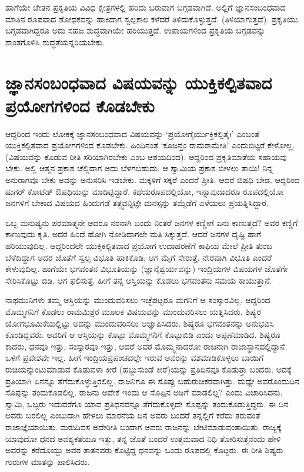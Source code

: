 ಹಾಗೆಯೇ ಚೇತನ ಪ್ರಕೃತಿಯ ವಿವಿಧ ಕ್ಷೇತ್ರಗಳಲ್ಲಿ ಹರಿದು ಬರುವಾಗ ಬಗ್ಗಡವಾಗಿದೆ. ಅಲ್ಲಿಗೆ ಜ್ಞಾನಸಂಬಂಧವಾದ ಮಾತಿನ ರೂಪವಾದ ಶೋಧಕವನ್ನು ಹಾಕಿದಾಗ ಸ್ವಲ್ಪಕಾಲ ಕಳೆದರೆ ತಿಳಿದುಕೊಳ್ಳುತ್ತದೆ. (ತಿಳಿಯಾಗುತ್ತದೆ). ಪ್ರಕೃತಿಯು ಬಗ್ಗಡವಾಗಿದ್ದರೂ ಅದು ಸಹಜ ಶುದ್ಧವಾಗಿಯೇ ಹರಿಯುತ್ತದೆ. ಉಪಾಯಗಳಿಂದ ಪ್ರಕೃತಿಯ ಬಗ್ಗಡವನ್ನು ಶಾಂತಗೊಳಿಸಿ ಶುದ್ಧತೆಯನ್ನರಿಯಬೇಕು.

\section*{ಜ್ಞಾನಸಂಬಂಧವಾದ ವಿಷಯವನ್ನು ಯುಕ್ತಿಕಲ್ಪಿತವಾದ ಪ್ರಯೋಗಗಳಿಂದ ಕೊಡಬೇಕು}

ಆದ್ದರಿಂದ ಇಂದು ಲೋಕಕ್ಕೆ ಜ್ಞಾನಸಂಬಂಧವಾದ ವಿಷಯವನ್ನು `ಪ್ರಯೋಗೈರ್ಯುಕ್ತಿಕಲ್ಪಿತೈಃ' ಎಂಬಂತೆ ಯುಕ್ತಿಕಲ್ಪಿತವಾದ ಪ್ರಯೋಗಗಳಿಂದ ಕೊಡಬೇಕು. ಹಿಂದಿನಂತೆ `ಕೂಜನ್ತಂ ರಾಮರಾಮೇತಿ' ಎಂದುಬಿಟ್ಟರೆ ಕೇಳೋಲ್ಲ. (ವಿಷಯವನ್ನು ಕೊಡುವ ರೀತಿ ಸರಿಯಾಗಿರಬೇಕು ಎಂಬ ಆಶಯದಿಂದ). ಆದ್ದರಿಂದ ಪ್ರಕೃತಿಮಾತೆಯ ಸಹಾಯವು ಬೇಕು. ಅಲ್ಲಿ ಆತ್ಮನ ಪ್ರಕಾಶ ಚೆಲ್ಲಿದಾಗ ಅದು ಬೆಳಗಬಹುದು. ಆ ಸ್ವಾಮಿಯ ಪ್ರಕಾಶ ಬೀಳಲು ತಾಯಿ! ನಿನ್ನ ಅನುರಾಗವೂ ಬೇಕು ಅದನ್ನು ಅನುಸರಿಸಿ ಇಡಬೇಕು. ಮಕ್ಕಳಿಗೆ ಸಕ್ಕರೆ ಎಂದರೆ ಪ್ರೀತಿ. ಆದರೆ ಔಷಧಿ ಬೇಡ. ಆದ್ದರಿಂದ ಷುಗರ್ ಕೋಟೆಡ್ ಔಷಧಿಯನ್ನು ಮಾಡಿಟ್ಟಿದ್ದಾರೆ. ಕಥೆಯರೂಪದಲ್ಲಿಯೋ, ಇನ್ನಾವುದಾದರೂ ರೂಪದಲ್ಲಿಯೋ ಜನಗಳಿಗೆ ಬೇಕಾದ ವಿಷಯದ ಹಿಂದುಗಡೆ ತತ್ತ್ವವನ್ನಿಟ್ಟೇ ಮನಸ್ಸನ್ನು ತಮ್ಮೆಡೆಗೆ ಎಳೆಯಲು ಪ್ರಯತ್ನಿಸಿದ್ದಾರೆ.

ಒಬ್ಬ ಮನುಷ್ಯನು ಪರಮಾತ್ಮನೇ ಆದರೂ ನರನಾಗಿ ಬಂದು ನಿಂತರೆ ಜನಗಳ ಕಣ್ಣೀಗೆ ಏನು ಕಾಣುತ್ತದೆ? ಅವರ ಕಣ್ಣಿಗೆ ಕಾಣುವುದು ಕೃತಿ. ಅದರ ಹಿಂದೆ ಹೋಗಿ ನೋಡಿದಾಗಲೇ ಮತಿ ಸಿಕ್ಕುತ್ತದೆ. ಆದರೆ ಜನಗಳ ದೃಷ್ಟಿ ಹಾಗೆ ಹರಿಯುವುದಿಲ್ಲ. ಆದ್ದರಿಂದಲೇ ಯುಕ್ತಿಕಲ್ಪಿತವಾದ ಪ್ರಯೋಗ ಉದಾಹರಣೆಗೆ ಕಾಫಿಯ ಮೇಲೆ ಪ್ರೀತಿ ತುಂಬ ಬೆಳೆದಿದ್ದಾಗ ಅದರ ಜೊತೆಗೆ ಸ್ವಲ್ಪ ವಿಭೂತಿ ಹಾಕಿಕೊಡಿ, ಆಗ ಮೈಗೆ ಸೇರುತ್ತೆ. ನೇರವಾಗಿ ವಿಭೂತಿ ಎಂದರೆ ಕೇಳುವುದಿಲ್ಲ. ಹಾಗೆಯೇ ಭಗವಂತನ ವಿಭೂತಿಯನ್ನು (ಜ್ಞಾನೈಶ್ವರ್ಯವನ್ನು) ಇಂದ್ರಿಯಗಳ ವಿಷಯಗಳ ಜೊತೆಗೇ ಸೇರಿಸಿಕೊಟ್ಟು ಬಿಡಿ. ಆಗ ಫಲಿಸುತ್ತೆ. ಹೀಗೆ ತನ್ನ ಆಸ್ತಿಯನ್ನು ಕೊಡಲು ಭಗವಂತನು ಸಮಯ ಕಾಯುತ್ತಾನೆ.

ನಾಥಮುನಿಗಳು ತಮ್ಮ ಆಸ್ತಿಯನ್ನು ಮುಂದುವರಿಸಲು ಇಚ್ಛೆಪಟ್ಟರೂ ಮಗನಿಗೆ ಆ ಸಂಸ್ಕಾರವಿಲ್ಲ. ಆದ್ದರಿಂದ ಮೊಮ್ಮಗನಿಗೆ ಕೊಡಲು ರಾಮಮಿಶ್ರರ ಮೂಲಕ ವಿಷಯವನ್ನು ಮುಂದುವರಿಸಲು ಯತ್ನಿಸಿದರು. ಶಿಷ್ಯರ ಯೋಗಭೂಮಿಕೆಯಲ್ಲಿಟ್ಟು ಅದನ್ನು ಮುಂದುವರಿಸಲು ಆಜ್ಞಾಪಿಸಿದರು. ಶಿಷ್ಯರೂ ಭಗವಂತನನ್ನು ಅನುಭವಿಸಿ ಕೊಂಡಿದ್ದವರು. ಅವರಿಗೆ ಆ ಆಸ್ತಿಯನ್ನು ಕೊಟ್ಟು ಮೊಮ್ಮಗನಿಗೆ ಕೊಟ್ಟುಬಿಡಿ ಎಂದು ಅಪ್ಪಣೆಮಾಡಿದ. ಶಿಷ್ಯರೂ ಕಾದರು, ಧನವೂ ಇತ್ತು, ಸಂಸ್ಕಾರವೂ ಇತ್ತು, ಆದರೆ ಅವರ ಮೊಮ್ಮ್ಗನಾದರೋ ರಾಜನಾಗಿ ರಾಜಾಸ್ಥಾನದಲ್ಲಿದ್ದಾನೆ. ಒಳಗೆ ಪ್ರವೇಶವೇ ಇಲ್ಲ. ಹೀಗೆ ಇಂದ್ರಿಯಪ್ರಪಂಚದಲ್ಲೇ ಇರುವ ಅವರನ್ನು ವಶಮಾಡಿಕೊಳ್ಳಲು ಬಾಯಿಗೆ ರುಚಿಯನ್ನುಂಟುಮಾಡುವ ಕೊಡುವಳಾ ಕೀರೆ (ಹಬ್ಬುಸುಂಡೆ ಕೀರೆ)ಯನ್ನು ಪ್ರತಿದಿನವೂ ಕೊಡುತ್ತಾ ಬಂದರು. ಅದಕ್ಕೆ ಪ್ರತಿಯಾಗಿ ಏನನ್ನೂ ತೆಗೆದುಕೊಳ್ಳುತ್ತಿರಲಿಲ್ಲ. ರಾಜನಿಗೂ ಈ ಸೊಪ್ಪು ಬಹುರುಚಿಕರವಾಗಿತ್ತು. ಮಧ್ಯೇ ಅವರೊಂದುದಿನ ಸೊಪ್ಪನ್ನು ತಂದುಕೊಡಲಿಲ್ಲ. ರಾಜನು ಅದೇಕೆ ಇಂದು ಆ ಸೊಪ್ಪಿನ ಅಡಿಗೆ ಮಾಡಲಿಲ್ಲ? ಎಂದು ವಿಚಾರಿಸಿದನು. ಸ್ವಾಮಿ, ಒಬ್ಬರು ಇದುವರೆಗೂ ಯಾವ ಪ್ರತಿಧನವನ್ನೂ ತೆಗೆದುಕೊಳ್ಳದೇ ಸೊಪ್ಪನ್ನು ತಂದುಕೊಡುತ್ತಿದ್ದರು. ಈ ದಿನ ಅವರು ಬರಲಿಲ್ಲ ಎಂಬುದಾಗಿ ಹೇಳಲು ಮಾರನೆಯ ದಿನ ಅವರು ಬಂದರೆ ತನ್ನಲ್ಲಿಗೆ ಕರೆದು ತರುವಂತೆ ರಾಜಾಜ್ಞೆಯಾಯಿತು. ಮರುದಿವಸ ಅದೇರೀತಿ ಬಂದಾಗ ಅವರು ರಾಜನನ್ನು ಬೇಟಿಮಾಡುವಂತಾಯಿತು. ರಾಜ್ಯಕ್ಕೆ  ಯಾವುದೋ ಧನದ ಅವಶ್ಯಕತೆಯೂ ಇತ್ತು, ತನ್ನ ಜೊತೆ ಬಂದರೆ ಉತ್ತಮವಾದ ನಿಧಿ ತೋರಿಸುತ್ತೆನೆಂದು ಹೇಳಿ ಅವರನ್ನು ಕರೆದೊಯ್ದು ಅವರ ತಾತನವರು ಕೊಟ್ಟಿದ್ದ ಧನವನ್ನು ಒಂದು ರೂಪದಲ್ಲಿ ಕೊಟ್ಟರು. ಈ ರೀತಿ ಶಿಷ್ಯರು ಗುರುಗಳ ಮಾತನ್ನು ಪಾಲಿಸಿದರು.

